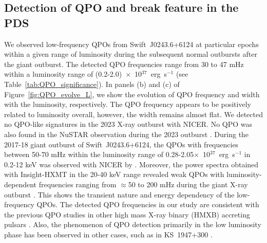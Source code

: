\documentclass[twocolumn,trackchanges]{aastex631}
\begin{document}
\subsection{Detection of QPO and break feature in the PDS}

We observed low-frequency QPOs from Swift~J0243.6+6124 at particular epochs within a given range of luminosity during the subsequent normal outbursts after the giant outburst. The detected QPO frequencies range from 30 to 47 mHz within a luminosity range of (0.2-2.0)~$\times$~10$^{37}$~erg~s$^{-1}$ (see Table~\ref{tab:QPO_significance}).  In panels (b) and (c)  of Figure~\ref{fig:QPO_evolve_L}, we show the evolution of QPO frequency and width with the luminosity, respectively. The QPO frequency appears to be positively related to luminosity overall, however, the width remains almost flat. We detected no QPO-like signatures in the 2023 X-ray outburst with NICER.  No QPO was also found in the NuSTAR observation during the 2023 outburst \citep{2023ATel16139....1P}. During the 2017-18 giant outburst of Swift~J0243.6+6124, the QPOs with frequencies between 50-70 mHz within the luminosity range of 0.28-2.05$\times$~10$^{37}$~erg~s$^{-1}$ in 0.2-12 keV was observed with NICER by \citet{2018ApJ...863....9W}. Moreover, the power spectra obtained with Insight-HXMT in the 20-40 keV range revealed weak QPOs with luminosity-dependent frequencies ranging from $\approx$50 to 200 mHz during the giant X-ray outburst \citep{2020MNRAS.491.1857D}.   This shows the transient nature and energy dependency of the low-frequency QPOs. The detected QPO frequencies in our study are consistent with the previous QPO studies in other high mass X-ray binary (HMXB) accreting pulsars \citep{2011BASI...39..429P}. Also, the phenomenon of QPO detection primarily in the low luminosity phase has been observed in other cases, such as in KS~1947+300 \citep{2010MNRAS.407..285J}.

 
\end{document}
